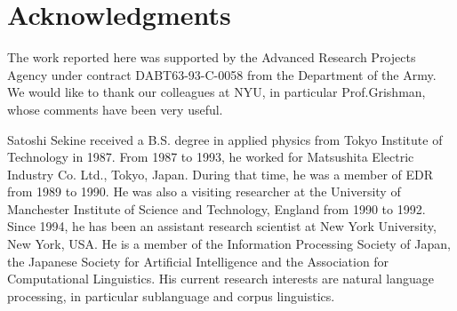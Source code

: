 \section{Acknowledgments}

The work reported here was supported by the Advanced Research Projects Agency
under contract DABT63-93-C-0058 from the Department of the Army.
We would like to thank our colleagues at NYU, in particular
Prof.Grishman, whose comments have been very useful.






\begin{biography}

\biotitle{}

{
Satoshi Sekine received a B.S. degree in applied physics from
Tokyo Institute of Technology in 1987.
From 1987 to 1993, he worked for Matsushita Electric Industry Co. Ltd., Tokyo, Japan.
During that time, he was a member of EDR from 1989 to 1990. He was
also a visiting researcher at the University of Manchester Institute of
Science and Technology, England from 1990 to 1992.
Since 1994, he has been an assistant research scientist
at New York University, New York, USA.
He is a member of 
the Information Processing Society of Japan,
the Japanese Society for Artificial Intelligence
and the Association for Computational Linguistics.
His current research interests are natural language processing, 
in particular sublanguage and corpus linguistics.
}


\end{biography}






